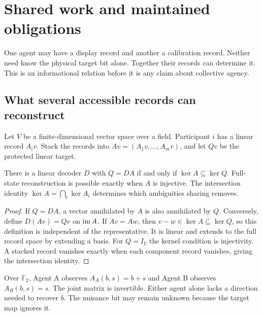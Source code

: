 \chapter{Shared work and maintained obligations}\label{ch:shared}
One agent may have a display record and another a calibration record. Neither need know the physical target bit alone. Together their records can determine it. This is an informational relation before it is any claim about collective agency.

\section{What several accessible records can reconstruct}
Let $V$ be a finite-dimensional vector space over a field. Participant $i$ has a linear record $A_i v$. Stack the records into $Av=(A_1v,\ldots,A_mv)$, and let $Qv$ be the protected linear target.

\begin{proposition}\label{r:reconstruction}
There is a linear decoder $D$ with $Q=DA$ if and only if $\ker A\subseteq\ker Q$. Full-state reconstruction is possible exactly when $A$ is injective. The intersection identity $\ker A=\bigcap_i\ker A_i$ determines which ambiguities sharing removes.
\end{proposition}
\begin{proof}
If $Q=DA$, a vector annihilated by $A$ is also annihilated by $Q$. Conversely, define $D(Av)=Qv$ on $\operatorname{im} A$. If $Av=Aw$, then $v-w\in\ker A\subseteq\ker Q$, so this definition is independent of the representative. It is linear and extends to the full record space by extending a basis. For $Q=I_V$ the kernel condition is injectivity. A stacked record vanishes exactly when each component record vanishes, giving the intersection identity.
\end{proof}

Over $\mathbb F_2$, Agent A observes $A_A(b,s)=b+s$ and Agent B observes $A_B(b,s)=s$. The joint matrix is invertible. Either agent alone lacks a direction needed to recover $b$. The nuisance bit may remain unknown because the target map ignores it.

